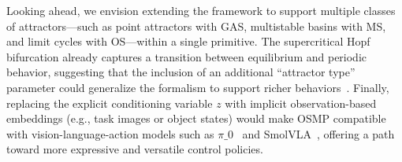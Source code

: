 Looking ahead, we envision extending the framework to support multiple classes of attractors—such as point attractors with \gls{GAS}, multistable basins with \gls{MS}, and limit cycles with \gls{OS}—within a single primitive. The supercritical Hopf bifurcation already captures a transition between equilibrium and periodic behavior, suggesting that the inclusion of an additional “attractor type” parameter could generalize the formalism to support richer behaviors~\citep{strogatz2018nonlinear}. Finally, replacing the explicit conditioning variable $z$ with implicit observation-based embeddings (e.g., task images or object states) would make \gls{OSMP} compatible with vision-language-action models such as $\pi\_0$~\citep{black2024pi0} and SmolVLA~\citep{shukor2025smolvla}, offering a path toward more expressive and versatile control policies.